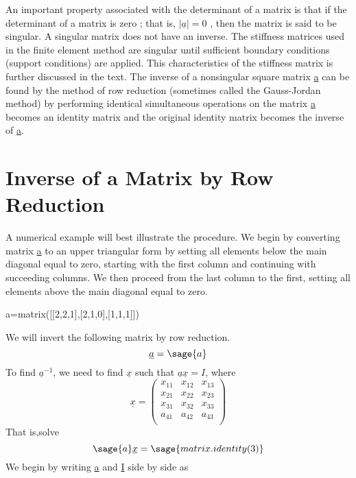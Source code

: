 \documentclass[12pt]{report}
\begin{document}
An important property associated with the determinant of a matrix is
that if the determinant of a matrix is zero ; that is,
$|\underline{a}| =0$ , then the matrix is said to be singular. A
singular matrix does not have an inverse. The stiffness matrices used
in the finite element method are singular until sufficient boundary
conditions (support conditions) are applied. This characteristics of
the stiffness matrix is further discussed in the text.
The inverse of a nonsingular square matrix \underline{a} can be found
by the method of row reduction (sometimes called the Gauss-Jordan
method) by performing identical simultaneous operations on the matrix
\underline{a} becomes an identity matrix and the original identity
matrix becomes the inverse of \underline{a}.

\section{Inverse of a Matrix by Row Reduction}\label{last}
A numerical example will best illustrate the procedure. We begin by
converting matrix \underline{a} to an upper triangular form by setting
all elements below the main diagonal equal to zero, starting with the
first column and continuing with succeeding columns. We then proceed
from the last column to the first, setting all elements above the main
diagonal equal to zero.
\begin{sagesilent}
a=matrix([[2,2,1],[2,1,0],[1,1,1]])
\end{sagesilent}
We will invert the following matrix by row reduction.
\begin{equation}\underline{a} = \sage{a}\end{equation}
To find $\underline{a}^{-1}$, we need to find $\underline{x}$ such that
$\underline{a}\underline{x}=I$, where
\begin{equation}\underline{x}=\left(\begin{array}{rrr}
x_{11} & x_{12} & x_{13} \\
x_{21} & x_{22} & x_{23} \\
x_{31} & x_{32} & x_{33} \\
a_{41} & a_{42} & a_{43}  \\
\end{array}\right)\end{equation}
That is,solve\begin{equation} \sage{a}\underline{x} = \sage{matrix.identity(3)}\end{equation}
We begin by writing \underline{a} and \underline{I} side by side as
\end{document}
